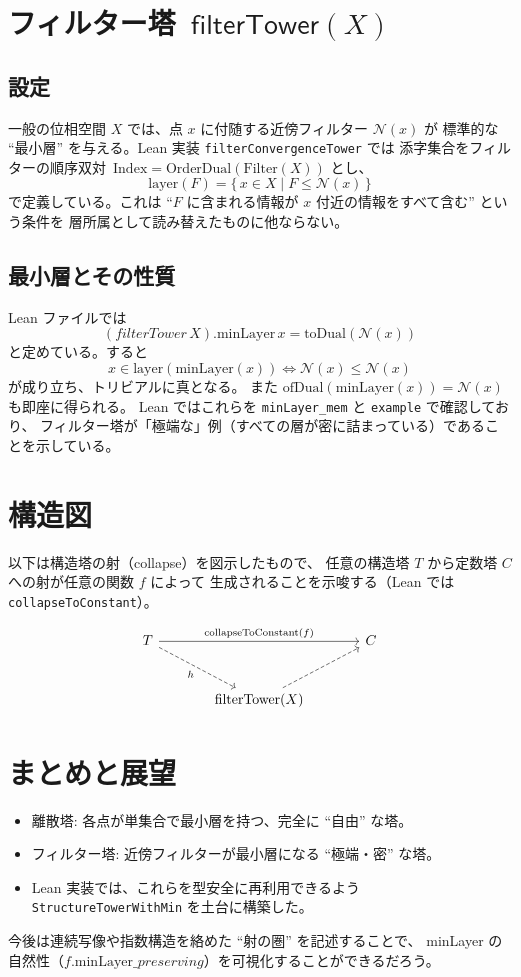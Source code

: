 \documentclass[a4paper]{ltjsarticle}
\newcommand{\minLayer}{\mathrm{minLayer}} %
\begin{document}
\section{フィルター塔 $\,\mathsf{filterTower}(X)$}
\subsection{設定}
一般の位相空間 $X$ では、点 $x$ に付随する近傍フィルター $\mathcal{N}(x)$ が
標準的な ``最小層'' を与える。Lean 実装 \texttt{filterConvergenceTower} では
添字集合をフィルターの順序双対 $\,\mathrm{Index} = \mathrm{OrderDual}(\mathrm{Filter}(X))$ とし、
\[
  \mathrm{layer}(F) = \{\, x \in X \mid F \le \mathcal{N}(x) \,\}
\]
で定義している。これは
``$F$ に含まれる情報が $x$ 付近の情報をすべて含む'' という条件を
層所属として読み替えたものに他ならない。

\subsection{最小層とその性質}
Lean ファイルでは
\[
  (filterTower\,X).\minLayer\, x = \mathrm{toDual}(\mathcal{N}(x))
\]
と定めている。すると
\[
  x \in \mathrm{layer}(\minLayer(x))
  \iff \mathcal{N}(x) \le \mathcal{N}(x)
\]
が成り立ち、トリビアルに真となる。
また $\mathrm{ofDual}(\minLayer(x)) = \mathcal{N}(x)$ も即座に得られる。
Lean ではこれらを
\texttt{minLayer\_mem} と \texttt{example} で確認しており、
フィルター塔が「極端な」例（すべての層が密に詰まっている）であることを示している。

\section{構造図}
以下は構造塔の射（collapse）を図示したもので、
任意の構造塔 $T$ から定数塔 $C$ への射が任意の関数 $f$ によって
生成されることを示唆する（Lean では \texttt{collapseToConstant}）。

\[
\begin{tikzcd}[row sep=large, column sep=large]
T \arrow[rr, "\mathrm{collapseToConstant}(f)"] \arrow[dr, dashed, "h"'] & & C \\
& \text{filterTower}(X) \arrow[ur, dashed] &
\end{tikzcd}
\]

\section{まとめと展望}
\begin{itemize}
  \item 離散塔: 各点が単集合で最小層を持つ、完全に ``自由'' な塔。
  \item フィルター塔: 近傍フィルターが最小層になる ``極端・密'' な塔。
  \item Lean 実装では、これらを型安全に再利用できるよう
        \texttt{StructureTowerWithMin} を土台に構築した。
\end{itemize}
今後は連続写像や指数構造を絡めた ``射の圏'' を記述することで、
minLayer の自然性（$f.\minLayer\_preserving$）を可視化することができるだろう。
\end{document}
